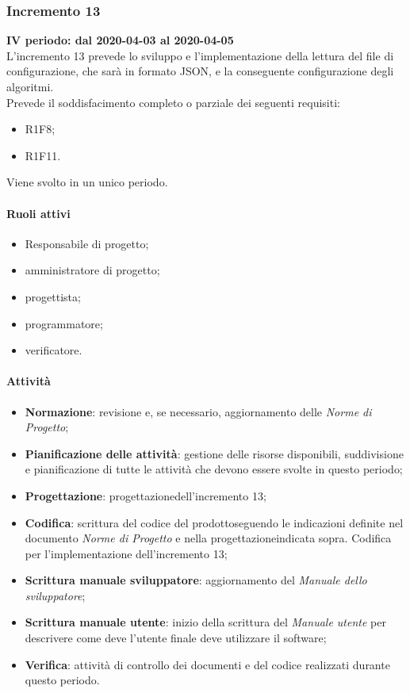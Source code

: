 \subsubsection{Incremento 13}
\textbf{IV periodo: dal 2020-04-03 al 2020-04-05} \\
L'incremento 13 prevede lo sviluppo e l'implementazione della lettura del file di configurazione, che sarà in formato JSON, e la conseguente configurazione degli algoritmi.
\\Prevede il soddisfacimento completo o parziale dei seguenti requisiti:
\begin{itemize}
	\item R1F8;
	\item R1F11.
\end{itemize}
Viene svolto in un unico periodo.
\paragraph{Ruoli attivi}
\begin{itemize}
	\item Responsabile di progetto\glo;
	\item amministratore di progetto\glo;
	\item progettista;
	\item programmatore;
	\item verificatore.
\end{itemize}
\paragraph{Attività} 
\begin{itemize}
	\item \textbf{Normazione}: revisione e, se necessario, aggiornamento delle \textit{Norme di Progetto};
	\item \textbf{Pianificazione delle attività}: gestione delle risorse disponibili, suddivisione e pianificazione di tutte le attività che devono essere svolte in questo periodo;
	\item \textbf{Progettazione}\glo: progettazione\glosp dell'incremento 13;  
	\item \textbf{Codifica}: scrittura del codice del prodotto\glosp seguendo le indicazioni definite nel documento \textit{Norme di Progetto} e nella progettazione\glosp indicata sopra. Codifica per l'implementazione dell'incremento 13;
	\item \textbf{Scrittura manuale sviluppatore}: aggiornamento del \textit{Manuale dello sviluppatore};
	\item \textbf{Scrittura manuale utente}: inizio della scrittura del \textit{Manuale utente} per descrivere come deve l'utente finale deve utilizzare il software;
	\item \textbf{Verifica}: attività di controllo dei documenti e del codice realizzati durante questo periodo.
\end{itemize}
